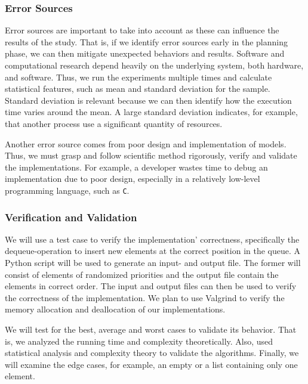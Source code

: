 \documentclass[a4paper,11pt]{kth-mag}
\newcommand*{\skippara}{\par\vspace{\baselineskip} \noindent}
\begin{document}
\subsubsection{Error Sources}
Error sources are important to take into account as these can influence the results of the study.
That is, if we identify error sources early in the planning phase, we can then mitigate unexpected behaviors and results.
Software and computational research depend heavily on the underlying system, both hardware, and software.
Thus, we run the experiments multiple times and calculate statistical features, such as mean and standard deviation for the sample.
Standard deviation is relevant because we can then identify how the execution time varies around the mean.
A large standard deviation indicates, for example, that another process use a significant quantity of resources.

\skippara Another error source comes from poor design and implementation of
models.  Thus, we must grasp and follow scientific method rigorously, verify
and validate the implementations.  For example, a developer wastes time to
debug an implementation due to poor design, especially in a relatively
low-level programming language, such as \texttt{C}.

\subsubsection{Verification and Validation}
We will use a test case to verify the implementation' correctness, specifically the dequeue-operation to insert new elements at the correct position in the queue.
A Python script will be used to generate an input- and output file.
The former will consist of elements of randomized priorities and the output file contain the elements in correct order.
The input and output files can then be used to verify the correctness of the implementation.
We plan to use Valgrind to verify the memory allocation and deallocation of our implementations.

\skippara We will test for the best, average and worst cases to validate its behavior.
That is, we analyzed the running time and complexity theoretically.
Also, used statistical analysis and complexity theory to validate the algorithms.
Finally, we will examine the edge cases, for example, an empty or a list containing only one element.

\clearpage
\end{document}
